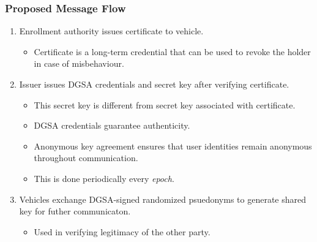 \documentclass{beamer}
\begin{document}
    \begin{frame}
        \frametitle{Proposed Message Flow}
        \begin{enumerate}
            \item<1-> Enrollment authority issues certificate to vehicle.
            \begin{itemize}
                \item Certificate is a long-term credential that can be used to
                revoke the holder in case of misbehaviour.
            \end{itemize}
            \item<2-> Issuer issues DGSA credentials and secret key after
            verifying certificate.
            \begin{itemize}
                \item This secret key is different from secret key associated
                with certificate.
                \item DGSA credentials guarantee authenticity.
                \item Anonymous key agreement ensures that user identities
                remain anonymous throughout communication.
                \item This is done periodically every \emph{epoch}.
            \end{itemize}
            \item<3-> Vehicles exchange DGSA-signed randomized psuedonyms to
            generate shared key for futher communicaton.
            \begin{itemize}
                \item Used in verifying legitimacy of the other party.
            \end{itemize}
        \end{enumerate}
    \end{frame}
\end{document}
